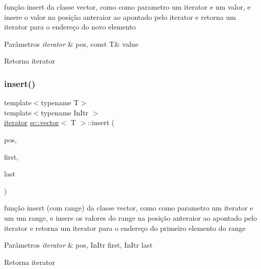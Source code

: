função insert da classe vector, como como parametro um iterator e um valor, e insere o valor na posição anteraior ao apontado pelo iterator e retorna um iterator para o endereço do novo elemento 
\begin{DoxyParams}{Parâmetros}
{\em iterator} & pos, const T\& value \\
\hline
\end{DoxyParams}
\begin{DoxyReturn}{Retorna}
iterator 
\end{DoxyReturn}
\mbox{\label{classsc_1_1vector_a4cc533cc8f7fbd95ee965583650ee085}} 
\subsubsection{\texorpdfstring{insert()}{insert()}\hspace{0.1cm}{\footnotesize\ttfamily [2/9]}}
{\footnotesize\ttfamily template$<$typename T$>$ \\
template$<$typename In\+Itr $>$ \\
\mbox{\hyperlink{classsc_1_1vector_1_1iterator}{iterator}} \mbox{\hyperlink{classsc_1_1vector}{sc\+::vector}}$<$ T $>$\+::insert (\begin{DoxyParamCaption}\item[{\mbox{\hyperlink{classsc_1_1vector_1_1iterator}{iterator}}}]{pos,  }\item[{In\+Itr}]{first,  }\item[{In\+Itr}]{last }\end{DoxyParamCaption})}

função insert (com range) da classe vector, como como parametro um iterator e um um range, e insere os valores do range na posição anteraior ao apontado pelo iterator e retorna um iterator para o endereço do primeiro elemento do range 
\begin{DoxyParams}{Parâmetros}
{\em iterator} & pos, In\+Itr first, In\+Itr last \\
\hline
\end{DoxyParams}
\begin{DoxyReturn}{Retorna}
iterator 
\end{DoxyReturn}
\mbox{\label{classsc_1_1vector_a1aaf0a1fcdac2a58a96a2a00105b2e1f}} 
